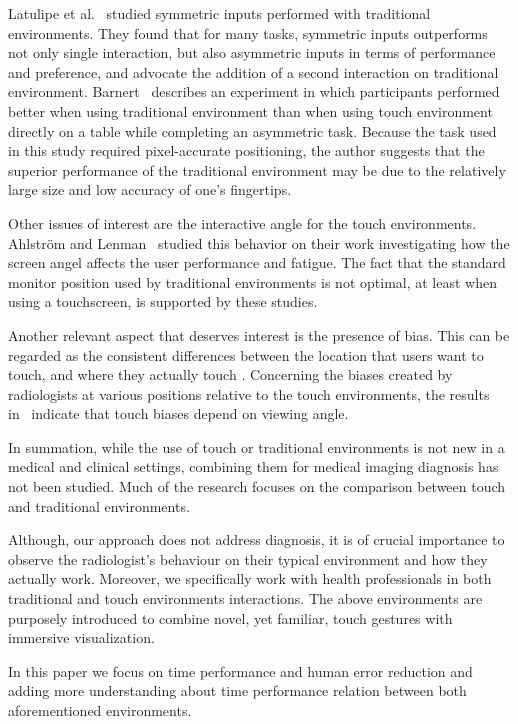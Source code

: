 \documentclass{sigchi}
\begin{document}
Latulipe et al.~\cite{latulipe2005bimanual, latulipe2006symspline} studied symmetric inputs performed with traditional environments. They found that for many tasks, symmetric inputs outperforms not only single interaction, but also asymmetric inputs in terms of performance and preference, and advocate the addition of a second interaction on traditional environment. Barnert~\cite{barnert2005comparison} describes an experiment in which participants performed better when using traditional environment than when using touch environment directly on a table while completing an asymmetric task. Because the task used in this study required pixel-accurate positioning, the author suggests that the superior performance of the traditional environment may be due to the relatively large size and low accuracy of one’s fingertips.

Other issues of interest are the interactive angle for the touch environments. Ahlstr\"{o}m and Lenman~\cite{ahlstrom1990fatigue} studied this behavior on their work investigating how the screen angel affects the user performance and fatigue. The fact that the standard monitor position used by traditional environments is not optimal, at least when using a touchscreen, is supported by these studies.

Another relevant aspect that deserves interest is the presence of bias.
This can be regarded as the consistent differences between the location that users want to touch, and where they actually touch
\cite{beringer1985underlying, beringer1989operator}. Concerning the biases  created by radiologists at various positions relative to the touch environments, the results in~\cite{hall1988factors} indicate that touch biases depend on viewing angle.

In summation, while the use of touch or traditional environments is not new in a medical and clinical settings, combining them for medical imaging diagnosis has not been studied. Much of the research focuses on the comparison between touch and traditional environments. 

Although, our approach does not address diagnosis, it is of crucial importance to observe the radiologist's behaviour on their typical environment and how they actually work. Moreover, we specifically work with health professionals in both traditional and touch environments interactions. The above environments are  purposely introduced to combine novel, yet familiar, touch gestures with immersive visualization.

In this paper we focus on time performance and human error reduction and adding more understanding about time performance relation between both aforementioned environments.
\end{document}
